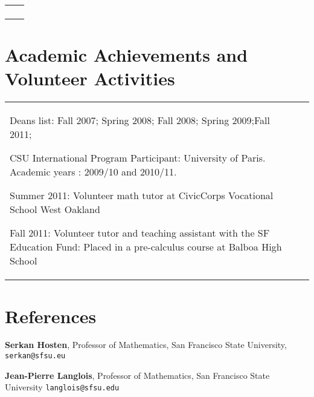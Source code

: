 \documentclass[margin,line,pifont,palatino,courier]{res}
\newenvironment{list1}{
  \begin{list}{\ding{113}}{%
      \setlength{\itemsep}{0in}
      \setlength{\parsep}{0in} \setlength{\parskip}{0in}
      \setlength{\topsep}{0in} \setlength{\partopsep}{0in}
      \setlength{\leftmargin}{0.17in}}}{\end{list}}
\begin{document}
\begin{resume}
\begin{tabular}{@{}p{2.5in}p{2.5in}}
\begin{list1}
\end{list1}
\end{tabular}

\newpage
\section{\sc Academic Achievements and Volunteer Activities}
\begin{tabular}{@{}p{4in}p{1in}}

\begin{list1}

\item Deans list:  Fall 2007; Spring 2008; Fall 2008; Spring 2009;Fall 2011;
\item CSU International Program Participant: University of Paris.  Academic years : 2009/10  and 2010/11.
\item Summer 2011:   Volunteer math tutor at CivicCorps Vocational School West Oakland
\item Fall 2011: Volunteer tutor and teaching assistant with the SF Education Fund: Placed in a pre-calculus course at Balboa High School 


\end{list1}

\end{tabular}




\section{\sc References}
{\bf Serkan Hosten}, Professor of Mathematics, San Francisco State University,
\texttt{serkan@sfsu.eu}

{\bf Jean-Pierre Langlois}, Professor of Mathematics, San Francisco State University
\texttt{langlois@sfsu.edu}


\end{resume}
\end{document}
